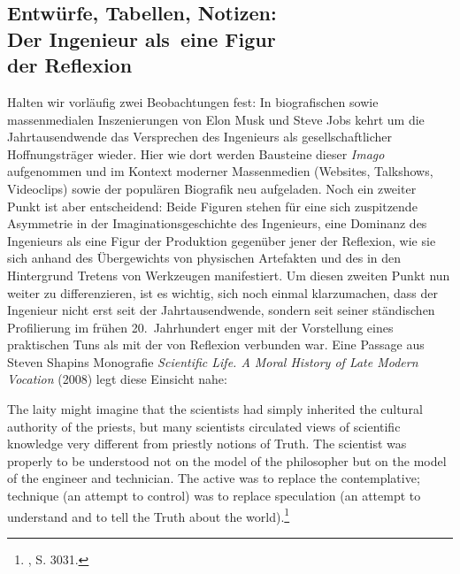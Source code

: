 \documentclass[%
	fontsize=10pt,%
	twoside,%
	headings=optiontoheadandtoc,%
	showtrims]{scrbook}
\renewenvironment{quote}{%
  \addmargin[\genericindent]{0pt}%
  \KOMAoptions{parskip=true}%
  \ifdim\parskip>0pt\else\addvspace{\intextsep}\fi
}{%
  \par
  \endaddmargin\vspace{\intextsep}
}
\renewcommand{\texttt}{\nohyphens} %
\begin{document}
\subsection[Entwürfe, Tabellen, Notizen:    Der Ingenieur als~eine Figur    der Reflexion]{Entwürfe, Tabellen, Notizen: \- \protect\\ Der Ingenieur als~eine Figur \- \protect\\ der Reflexion}
\par Halten wir vorläufig zwei Beobachtungen fest: In biografischen sowie massenmedialen Inszenierungen von Elon Musk und \texttt{Steve} Jobs kehrt um die Jahrtausendwende das Versprechen des Ingenieurs als gesellschaftlicher Hoffnungsträger wieder. Hier wie dort werden Bausteine dieser \emph{Imago} aufgenommen und im Kontext moderner Massenmedien (Websites, Talkshows, Videoclips) sowie der populären Biografik neu aufgeladen. Noch ein zweiter Punkt ist aber entscheidend: Beide Figuren stehen für eine sich zuspitzende Asymmetrie in der Imaginationsgeschichte des Ingenieurs, eine Dominanz des Ingenieurs als eine Figur der Produktion gegenüber jener der Reflexion, wie sie sich anhand des Übergewichts von physischen Artefakten und des in den Hintergrund Tretens von Werkzeugen manifestiert. Um diesen zweiten Punkt nun weiter zu differenzieren, ist es wichtig, sich noch einmal klarzumachen, dass der Ingenieur nicht erst seit der Jahrtausendwende, sondern seit seiner ständischen Profilierung im frühen \texttt{20.~Jahrhundert} enger mit der Vorstellung eines praktischen Tuns als mit der von Reflexion verbunden war. Eine Passage aus Steven Shapins Monografie \emph{Scientific Life. A Moral History of Late Modern Vocation} (2008) legt diese Einsicht nahe:\begin{quote}
\par The laity might imagine that the scientists had simply inherited the cultural authority of the priests, but many scientists circulated views of scientific knowledge very different from priestly notions of Truth. The scientist was properly to be understood not on the model of the philosopher but on the model of the engineer and technician. The active was to replace the contemplative; technique (an attempt to control) was to replace speculation (an attempt to understand and to tell the Truth about the world).\footnote{\cite[][]{shapin2008a}, S. 30\textendash{}31.} 
\end{quote}
\end{document}

